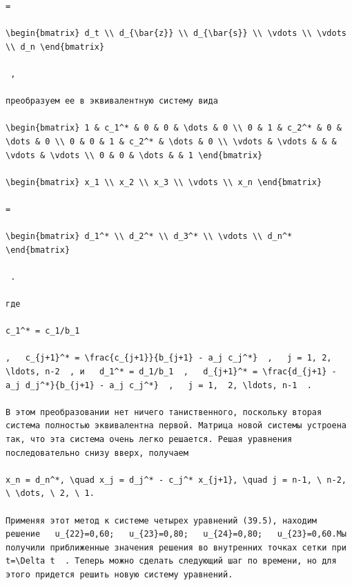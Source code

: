 \documentclass[
  ukrainian,
]{article}
\begin{document}
\begin{verbatim}
=

\begin{bmatrix} d_t \\ d_{\bar{z}} \\ d_{\bar{s}} \\ \vdots \\ \vdots \\ d_n \end{bmatrix}

 ,

преобразуем ее в эквивалентную систему вида

\begin{bmatrix} 1 & c_1^* & 0 & 0 & \dots & 0 \\ 0 & 1 & c_2^* & 0 & \dots & 0 \\ 0 & 0 & 1 & c_2^* & \dots & 0 \\ \vdots & \vdots & & & \vdots & \vdots \\ 0 & 0 & \dots & & 1 \end{bmatrix}

\begin{bmatrix} x_1 \\ x_2 \\ x_3 \\ \vdots \\ x_n \end{bmatrix}

=

\begin{bmatrix} d_1^* \\ d_2^* \\ d_3^* \\ \vdots \\ d_n^* \end{bmatrix}

 .

где

c_1^* = c_1/b_1

,   c_{j+1}^* = \frac{c_{j+1}}{b_{j+1} - a_j c_j^*}  ,   j = 1, 2, \ldots, n-2  , и   d_1^* = d_1/b_1  ,   d_{j+1}^* = \frac{d_{j+1} - a_j d_j^*}{b_{j+1} - a_j c_j^*}  ,   j = 1,  2, \ldots, n-1  .

В этом преобразовании нет ничего таниственного, поскольку вторая система полностью эквивалентна первой. Матрица новой системы устроена так, что эта система очень легко решается. Решая уравнения последовательно снизу вверх, получаем

x_n = d_n^*, \quad x_j = d_j^* - c_j^* x_{j+1}, \quad j = n-1, \ n-2, \ \dots, \ 2, \ 1.

Применяя этот метод к системе четырех уравнений (39.5), находим решение   u_{22}=0,60;   u_{23}=0,80;   u_{24}=0,80;   u_{23}=0,60.Мы получили приближенные значения решения во внутренних точках сетки при   t=\Delta t  . Теперь можно сделать следующий шаг по времени, но для этого придется решить новую систему уравнений.


\end{verbatim}
\end{document}
